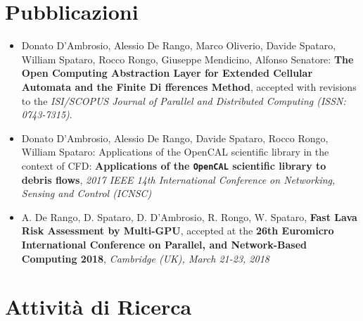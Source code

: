 \section{Pubblicazioni}
\begin{itemize}
	\item  Donato D'Ambrosio, Alessio De Rango, Marco Oliverio, Davide Spataro,
	William Spataro, Rocco Rongo, Giuseppe Mendicino, Alfonso Senatore:
	\textbf{The Open Computing Abstraction Layer for Extended Cellular
	Automata and the Finite Di fferences Method}, accepted with revisions to
	the \textit{ISI/SCOPUS Journal of Parallel and Distributed Computing (ISSN:
	0743-7315)}.

\item Donato D'Ambrosio, Alessio De Rango, Davide Spataro, Rocco Rongo,
William Spataro: Applications of the OpenCAL scientific library in
the context of CFD: \textbf{Applications of the \texttt{OpenCAL} scientific library to debris flows}, \textit{2017 IEEE 14th
International Conference on Networking, Sensing and Control (ICNSC)}

\item A. De Rango, D. Spataro, D. D’Ambrosio, R. Rongo, W. Spataro, \textbf{Fast
Lava Risk Assessment by Multi-GPU}, accepted at the \textbf{26th Euromicro
International Conference on Parallel, and Network-Based Computing
2018}, \textit{Cambridge (UK), March 21-23, 2018}

\end{itemize}


\section{Attività di Ricerca}


